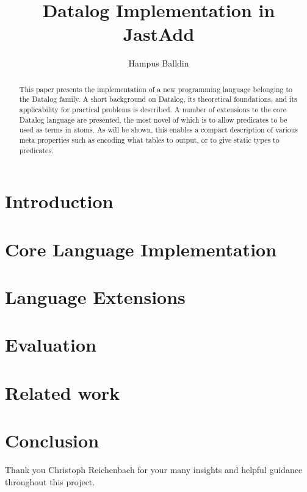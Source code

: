 \documentclass[sigplan,10pt]{acmart}
\begin{document}
\title[Short Title]{Datalog Implementation in JastAdd}         %



\author{Hampus Balldin}
\begin{abstract}
This paper presents the implementation of a new programming language belonging to the Datalog family.
A short background on Datalog, its theoretical foundations, and its applicability for practical problems is described.
A number of extensions to the core Datalog language are presented, the most novel of which is to allow predicates to be used as terms in atoms. As will be shown, this enables a compact description of various meta properties such as encoding what tables to output, or to give static types to predicates. 
\end{abstract}
\maketitle
\section{Introduction}

\section{Core Language Implementation}

\section{Language Extensions}

\vspace*{-15pt}
\section{Evaluation}

\vspace*{-5pt}
\section{Related work}

\section{Conclusion}

\begin{acks}
Thank you Christoph Reichenbach for your many insights and helpful guidance throughout this project.
\end{acks}

\clearpage

\end{document}
